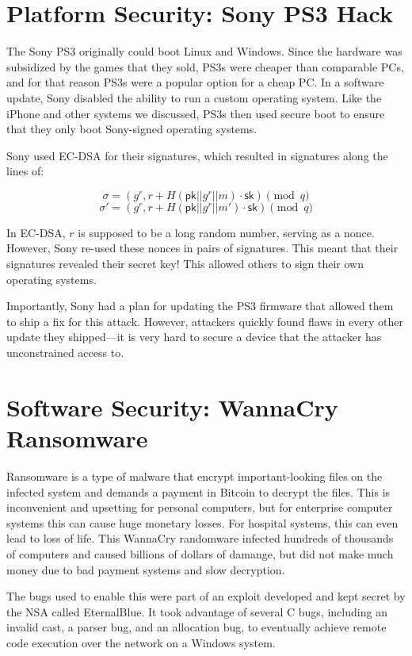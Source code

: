 \documentclass[
  letterpaper,
]{scrbook}
\newcommand{\sk}{\mathsf{sk}}
\newcommand{\pk}{\mathsf{pk}}
\theoremstyle{definition}
\theoremstyle{plain}
\theoremstyle{plain}
\theoremstyle{remark}
\begin{document}
\section{Platform Security: Sony PS3
Hack}\label{platform-security-sony-ps3-hack}

The Sony PS3 originally could boot Linux and Windows. Since the hardware
was subsidized by the games that they sold, PS3s were cheaper than
comparable PCs, and for that reason PS3s were a popular option for a
cheap PC. In a software update, Sony disabled the ability to run a
custom operating system. Like the iPhone and other systems we discussed,
PS3s then used secure boot to ensure that they only boot Sony-signed
operating systems.

Sony used EC-DSA for their signatures, which resulted in signatures
along the lines of:

\[ \sigma = (g^r, r + H(\pk || g^r || m)\cdot \sk) \pmod{q} \]
\[ \sigma' = (g^r, r + H(\pk || g^r || m')\cdot \sk) \pmod{q} \]

In EC-DSA, \(r\) is supposed to be a long random number, serving as a
nonce. However, Sony re-used these nonces in pairs of signatures. This
meant that their signatures revealed their secret key! This allowed
others to sign their own operating systems.

Importantly, Sony had a plan for updating the PS3 firmware that allowed
them to ship a fix for this attack. However, attackers quickly found
flaws in every other update they shipped---it is very hard to secure a
device that the attacker has unconstrained access to.

\section{Software Security: WannaCry
Ransomware}\label{software-security-wannacry-ransomware}

Ransomware is a type of malware that encrypt important-looking files on
the infected system and demands a payment in Bitcoin to decrypt the
files. This is inconvenient and upsetting for personal computers, but
for enterprise computer systems this can cause huge monetary losses. For
hospital systems, this can even lead to loss of life. This WannaCry
randomware infected hundreds of thousands of computers and caused
billions of dollars of damange, but did not make much money due to bad
payment systems and slow decryption.

The bugs used to enable this were part of an exploit developed and kept
secret by the NSA called EternalBlue. It took advantage of several C
bugs, including an invalid cast, a parser bug, and an allocation bug, to
eventually achieve remote code execution over the network on a Windows
system.
\end{document}

